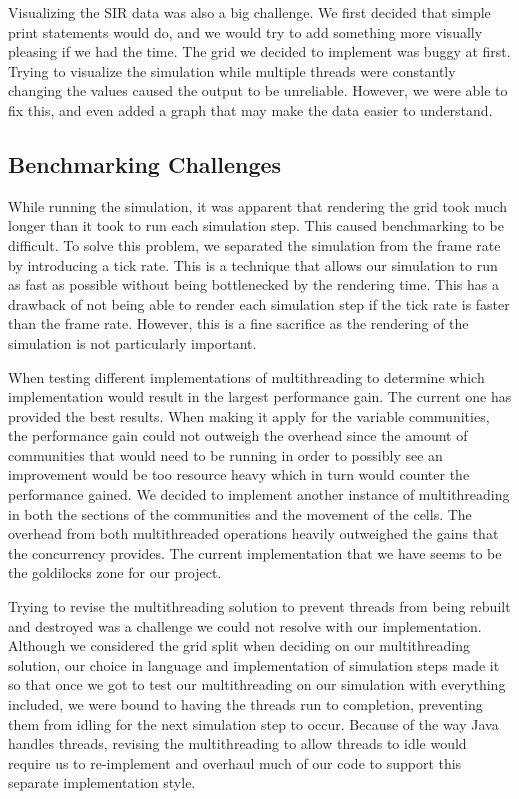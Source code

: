 \documentclass[conference]{IEEEtran}
\begin{document}
Visualizing the SIR data was also a big challenge. We first decided that simple print statements would do, and we would try to add something more visually pleasing if we had the time. The grid we decided to implement was buggy at first. Trying to visualize the simulation while multiple threads were constantly changing the values caused the output to be unreliable. However, we were able to fix this, and even added a graph that may make the data easier to understand.

\subsection{Benchmarking Challenges}

While running the simulation, it was apparent that rendering the grid took much longer than it took to run each simulation step. This caused benchmarking to be difficult. To solve this problem, we separated the simulation from the frame rate by introducing a tick rate. This is a technique that allows our simulation to run as fast as possible without being bottlenecked by the rendering time. This has a drawback of not being able to render each simulation step if the tick rate is faster than the frame rate. However, this is a fine sacrifice as the rendering of the simulation is not particularly important. 

When testing different implementations of multithreading to determine which implementation would result in the largest performance gain. The current one has provided the best results. When making it apply for the variable communities, the performance gain could not outweigh the overhead since the amount of communities that would need to be running in order to possibly see an improvement would be too resource heavy which in turn would counter the performance gained. We decided to implement another instance of multithreading in both the sections of the communities and the movement of the cells. The overhead from both multithreaded operations heavily outweighed the gains that the concurrency provides. The current implementation that we have seems to be the goldilocks zone for our project.

Trying to revise the multithreading solution to prevent threads from being rebuilt and destroyed was a challenge we could not resolve with our implementation. Although we considered the grid split when deciding on our multithreading solution, our choice in language and implementation of simulation steps made it so that once we got to test our multithreading on our simulation with everything included, we were bound to having the threads run to completion, preventing them from idling for the next simulation step to occur. Because of the way Java handles threads, revising the multithreading to allow threads to idle would require us to re-implement and overhaul much of our code to support this separate implementation style.
\end{document}
